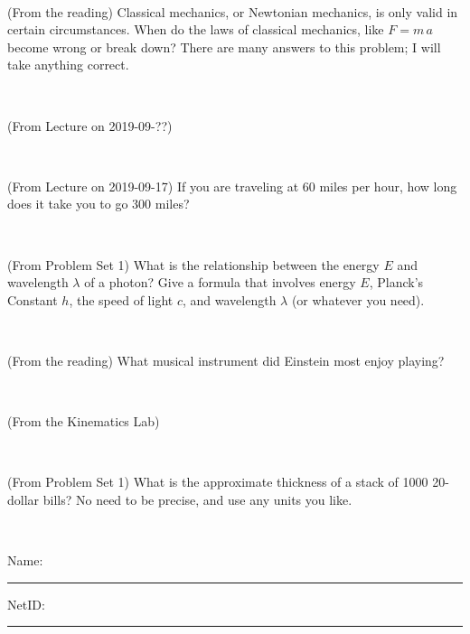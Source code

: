 \documentclass[12pt, letterpaper]{article}
\begin{document}
\vfill ~

\begin{problem} (From the reading)
Classical mechanics, or Newtonian mechanics, is only valid in certain
circumstances. When do the laws of classical mechanics, like $F =
m\,a$ become wrong or break down? There are many answers to this
problem; I will take anything correct.
\end{problem}


\vfill ~

\begin{problem} (From Lecture on 2019-09-??)
\end{problem}


\vfill ~

\begin{problem} (From Lecture on 2019-09-17)
If you are traveling at 60 miles per hour, how long does
it take you to go 300 miles?
\end{problem}


\vfill ~


\clearpage


\begin{problem} (From Problem Set 1)
What is the relationship between the energy $E$ and wavelength
$\lambda$ of a photon? Give a formula that involves energy $E$,
Planck's Constant $h$, the speed of light $c$, and wavelength
$\lambda$ (or whatever you need).
\end{problem}

\vfill ~

\begin{problem} (From the reading)
What musical instrument did Einstein most enjoy playing?
\end{problem}


\vfill ~

\begin{problem} (From the Kinematics Lab)

\end{problem}


\vfill ~

\begin{problem} (From Problem Set 1)
What is the approximate thickness of a stack of 1000 20-dollar bills?
No need to be precise, and use any units you like.
\end{problem}


\vfill ~


\cleardoublepage



\noindent
Name: \rule[-1ex]{0.60\textwidth}{0.1pt}
NetID: \rule[-1ex]{0.20\textwidth}{0.1pt}
\end{document}
